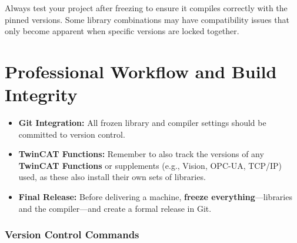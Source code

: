 \documentclass[11pt,a4paper]{article}
\begin{document}
\begin{warningbox}
Always test your project after freezing to ensure it compiles correctly with the pinned versions. Some library combinations may have compatibility issues that only become apparent when specific versions are locked together.
\end{warningbox}

\section{Professional Workflow and Build Integrity}

\begin{itemize}[leftmargin=*]
    \item \textbf{Git Integration:} All frozen library and compiler settings should be committed to version control.
    \item \textbf{TwinCAT Functions:} Remember to also track the versions of any \textbf{TwinCAT Functions} or supplements (e.g., Vision, OPC-UA, TCP/IP) used, as these also install their own sets of libraries.
    \item \textbf{Final Release:} Before delivering a machine, \textbf{freeze everything}---libraries and the compiler---and create a formal release in Git.
\end{itemize}

\subsubsection*{Version Control Commands}
\end{document}
